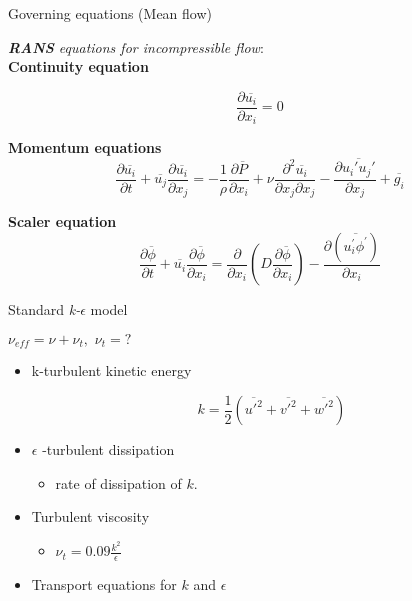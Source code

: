 \documentclass [xcolor=svgnames, t] {beamer}
\begin{document}
\begin{frame}{Governing equations (Mean flow)\autocite{Lecture3}}
  
 \textit{\textbf{RANS} equations for incompressible flow}:\\
  \textbf{Continuity equation}
  
     \begin{equation}
      \frac{\partial \overline{u_{i}}}{\partial x_{i}}=0
  \end{equation} 
  
 
  
  
  \textbf{Momentum equations }
  \begin{equation}
      \frac{\partial \overline{u_{i}} }{\partial t} + \overline{u_{j}} \frac{\partial \overline{u_{i}} }{\partial x_{j}} = -\frac{1}{\rho}\frac{\partial \overline{P}}{\partial x_{i}}+\nu\frac{\partial ^2\overline{u_{i}}}{\partial x_{j}\partial x_{j}}-\frac{\partial \overline{u_{i}'u_{j}'}}{\partial x_{j}}+\overline{g_{i}}
  \end{equation}
  
   \textbf{Scaler equation }
  \begin{equation}
     \frac{\partial \overline{\phi}}{\partial t}+\overline{u_{i}}\frac{\partial \overline{\phi}}{\partial x_{i}}=\frac{\partial}{\partial x_{i}}(D\frac{\partial \overline{\phi}}{\partial x_{i}})-\frac{\partial (\overline{{u_{i}^{'}\phi^{'}}})}{\partial x_{i}}
  \end{equation}
  
  
\end{frame}


\begin{frame}{Standard \textit{k-$\epsilon$} model\autocite{versteeg2007introduction}}

$\nu_{eff}=\nu+\nu_{t},\,\, \nu_{t}=?$
\begin{itemize}
    

\item k-turbulent kinetic energy

\begin{equation}
   k= \frac{1}{2}(\overline{u'^2}+\overline{v'^2}+\overline{w'^2})
\end{equation}
\item $\epsilon$ -turbulent dissipation
  \begin{itemize}
    \item rate of dissipation of $k$.
\end{itemize} 
\item Turbulent viscosity
\begin{itemize}
    \item  $\nu_{t}=0.09\frac{k^2}{\epsilon}$ 
\end{itemize}
\item Transport equations for $k$ and $\epsilon$
 \end{itemize}   
\end{frame}
\end{document}
